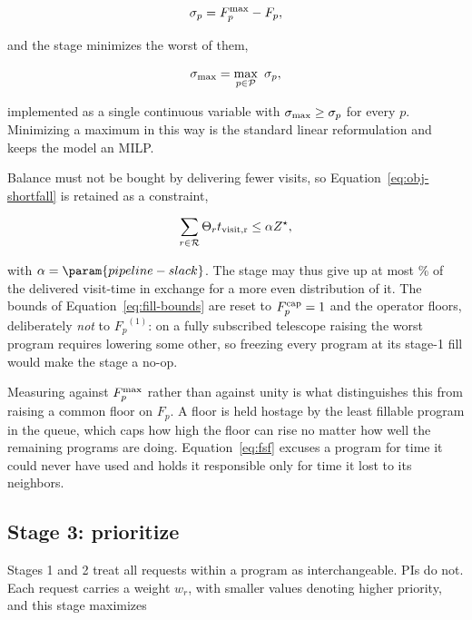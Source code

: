 \documentclass[twocolumn,linenumbers]{aastex63}
\def\Pcal{\mathcal{P}}
\def\Rcal{\mathcal{R}}
\newcommand{\isr}[2]{\ensuremath{#1_{\rm #2}}\xspace}
\newcommand{\Fp}{\ensuremath{F_p}\xspace}
\newcommand{\maff}{\ensuremath{F^{\rm max}_p}\xspace}
\newcommand{\fsf}{\ensuremath{\sigma_p}\xspace}
\newcommand{\fsfmax}{\ensuremath{\sigma_{\rm max}}\xspace}
\newcommand{\maxfill}{\ensuremath{F^{\rm cap}_p}\xspace}
\newcommand{\Zstar}{\ensuremath{Z^{\star}}\xspace}
\begin{document}
\begin{equation}
  \fsf = \maff - \Fp ,
  \label{eq:fsf}
\end{equation}

\noindent and the stage minimizes the worst of them,

\begin{equation}
  \fsfmax = \max_{p \in \Pcal} \ \fsf ,
  \label{eq:fsfmax}
\end{equation}

\noindent implemented as a single continuous variable with $\fsfmax \ge \fsf$
for every $p$. Minimizing a maximum in this way is the standard linear
reformulation and keeps the model an MILP.

Balance must not be bought by delivering fewer visits, so
Equation~\ref{eq:obj-shortfall} is retained as a constraint,

\begin{equation}
  \sum_{r \in \Rcal} \Theta_r \isr{t}{visit,r} \le \alpha \Zstar ,
  \label{eq:shortfall-cap}
\end{equation}

\noindent with $\alpha = \param{pipeline-slack}$. The stage may thus give up at
most \% of the delivered visit-time in exchange for a
more even distribution of it. The bounds of
Equation~\ref{eq:fill-bounds} are reset to $\maxfill = 1$ and the operator
floors, deliberately \emph{not} to $\Fp^{(1)}$: on a fully subscribed telescope
raising the worst program requires lowering some other, so freezing every
program at its stage-1 fill would make the stage a no-op.

Measuring against \maff rather than against unity is what distinguishes this
from raising a common floor on \Fp. A floor is held hostage by the least
fillable program in the queue, which caps how high the floor can rise no matter
how well the remaining programs are doing. Equation~\ref{eq:fsf} excuses a
program for time it could never have used and holds it responsible only for
time it lost to its neighbors.

\subsection{Stage 3: prioritize}
\label{sec:stages:prioritize}

Stages 1 and 2 treat all requests within a program as interchangeable. PIs do
not. Each request carries a weight $w_r$, with smaller values denoting higher
priority, and this stage maximizes
\end{document}
